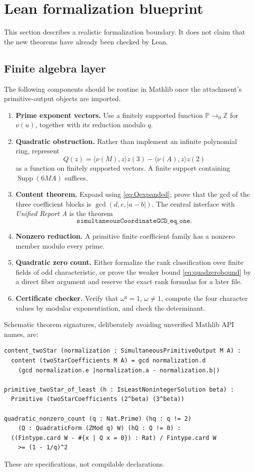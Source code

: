 \documentclass[11pt]{article}
\numberwithin{equation}{section}
\theoremstyle{definition}
\theoremstyle{remark}
\newcommand{\Z}{\mathbb Z}
\newcommand{\Supp}{\operatorname{Supp}}
\newcommand{\ReportA}{\textit{Unified Report A}}
\begin{document}
\section{Lean formalization blueprint}
\label{sec:lean}

This section describes a realistic formalization boundary.  It does not claim that the new
theorems have already been checked by Lean.

\subsection{Finite algebra layer}

The following components should be routine in Mathlib once the attachment's primitive-output
objects are imported.

\begin{enumerate}
\item \textbf{Prime exponent vectors.}  Use a finitely supported function
\(\mathbb P\to_0\Z\) for \(\nu(u)\), together with its reduction modulo \(q\).
\item \textbf{Quadratic obstruction.}  Rather than implement an infinite polynomial ring,
represent
\[
 Q(z)=\langle\nu(M),z\rangle z(3)-\langle\nu(A),z\rangle z(2)
\]
as a function on finitely supported vectors.  A finite support containing
\(\Supp(6MA)\) suffices.
\item \textbf{Content theorem.}  Expand using \eqref{eq:Qexpanded}; prove that the gcd of the
three coefficient blocks is \(\gcd(d,e,|a-b|)\).  The central interface with \ReportA{} is
the theorem
\[
 \texttt{simultaneousCoordinateGCD\_eq\_one}.
\]
\item \textbf{Nonzero reduction.}  A primitive finite coefficient family has a nonzero member
modulo every prime.
\item \textbf{Quadratic zero count.}  Either formalize the rank classification over finite
fields of odd characteristic, or prove the weaker bound \eqref{eq:quadzerobound} by a direct
fiber argument and reserve the exact rank formulas for a later file.
\item \textbf{Certificate checker.}  Verify that \(\omega^q=1\), \(\omega\ne1\), compute the
four character values by modular exponentiation, and check the determinant.
\end{enumerate}

Schematic theorem signatures, deliberately avoiding unverified Mathlib API names, are:
\begin{verbatim}
content_twoStar (normalization : SimultaneousPrimitiveOutput M A) :
  content (twoStarCoefficients M A) = gcd normalization.d
    (gcd normalization.e |normalization.a - normalization.b|)

primitive_twoStar_of_least (h : IsLeastNonintegerSolution beta) :
  Primitive (twoStarCoefficients (2^beta) (3^beta))

quadratic_nonzero_count (q : Nat.Prime) (hq : q != 2)
    (Q : QuadraticForm (ZMod q) W) (hQ : Q != 0) :
  ((Fintype.card W - #{x | Q x = 0}) : Rat) / Fintype.card W
    >= (1 - 1/q)^2
\end{verbatim}
These are specifications, not compilable declarations.
\end{document}
